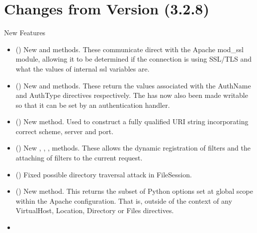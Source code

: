 \chapter{Changes from Version (3.2.8)\label{app-changes-from-3.2.8}}

  
  New Features

  \begin{itemize}
    \item
      ()
      New  and  methods.
      These communicate direct with the Apache mod_ssl module, allowing
      it to be determined if the connection is using SSL/TLS and what the
      values of internal ssl variables are.
    \item
      ()
      New  and  methods.
      These return the values associated with the AuthName and AuthType
      directives respectively. The  has now also
      been made writable so that it can be set by an authentication
      handler.
    \item
      ()
      New  method. Used to construct a fully
      qualified URI string incorporating correct scheme, server and port.
    \item
      ()
      New , ,
      , 
      methods. These allows the dynamic registration of filters and the
      attaching of filters to the current request.
    \item
      ()
      Fixed possible directory traversal attack in FileSession.
    \item
      ()
      New  method. This returns the subset
      of Python options set at global scope within the Apache configuration.
      That is, outside of the context of any VirtualHost, Location, Directory
      or Files directives.
    \item

\end{itemize}
